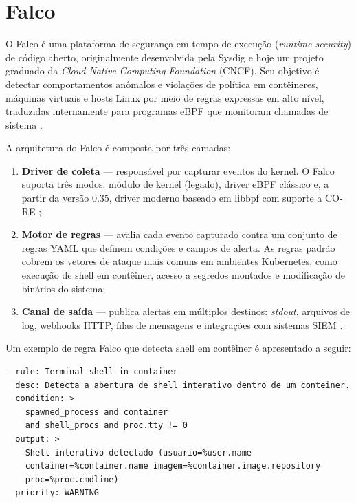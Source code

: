 \section{Falco}

O Falco é uma plataforma de segurança em tempo de execução (\textit{runtime
security}) de código aberto, originalmente desenvolvida pela Sysdig e hoje um
projeto graduado da \textit{Cloud Native Computing Foundation} (CNCF).
Seu objetivo é detectar comportamentos anômalos e violações de política em
contêineres, máquinas virtuais e hosts Linux por meio de regras expressas em
alto nível, traduzidas internamente para programas eBPF que monitoram chamadas
de sistema \cite{linuxkernel2024,gregg2019}.

A arquitetura do Falco é composta por três camadas:

\begin{enumerate}
  \item \textbf{Driver de coleta} --- responsável por capturar eventos do kernel.
        O Falco suporta três modos: módulo de kernel (legado), driver eBPF clássico
        e, a partir da versão 0.35, driver moderno baseado em libbpf com suporte
        a CO-RE \cite{nakryiko2020,libbpf};
  \item \textbf{Motor de regras} --- avalia cada evento capturado contra um conjunto
        de regras YAML que definem condições e campos de alerta. As regras padrão
        cobrem os vetores de ataque mais comuns em ambientes Kubernetes, como
        execução de shell em contêiner, acesso a segredos montados e modificação
        de binários do sistema;
  \item \textbf{Canal de saída} --- publica alertas em múltiplos destinos:
        \textit{stdout}, arquivos de log, webhooks HTTP, filas de mensagens e
        integrações com sistemas SIEM \cite{majors2022}.
\end{enumerate}

Um exemplo de regra Falco que detecta shell em contêiner é apresentado a seguir:

\begin{lstlisting}[language={},
  caption={Regra Falco para detecção de terminal interativo em contêiner.}]
- rule: Terminal shell in container
  desc: Detecta a abertura de shell interativo dentro de um conteiner.
  condition: >
    spawned_process and container
    and shell_procs and proc.tty != 0
  output: >
    Shell interativo detectado (usuario=%user.name
    container=%container.name imagem=%container.image.repository
    proc=%proc.cmdline)
  priority: WARNING
\end{lstlisting}

